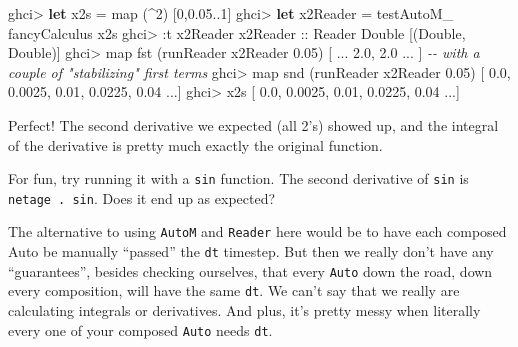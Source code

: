 \documentclass[]{article}
\newenvironment{Shaded}{}{}
\newcommand{\CommentTok}[1]{\textcolor[rgb]{0.38,0.63,0.69}{\textit{#1}}}
\newcommand{\DataTypeTok}[1]{\textcolor[rgb]{0.56,0.13,0.00}{#1}}
\newcommand{\DecValTok}[1]{\textcolor[rgb]{0.25,0.63,0.44}{#1}}
\newcommand{\FloatTok}[1]{\textcolor[rgb]{0.25,0.63,0.44}{#1}}
\newcommand{\FunctionTok}[1]{\textcolor[rgb]{0.02,0.16,0.49}{#1}}
\newcommand{\KeywordTok}[1]{\textcolor[rgb]{0.00,0.44,0.13}{\textbf{#1}}}
\newcommand{\NormalTok}[1]{#1}
\newcommand{\OperatorTok}[1]{\textcolor[rgb]{0.40,0.40,0.40}{#1}}
\newcommand{\OtherTok}[1]{\textcolor[rgb]{0.00,0.44,0.13}{#1}}
\begin{document}
\begin{Shaded}
\begin{Highlighting}[]
\NormalTok{ghci}\OperatorTok{>} \KeywordTok{let}\NormalTok{ x2s }\OtherTok{=} \FunctionTok{map}\NormalTok{ (}\OperatorTok{\^{}}\DecValTok{2}\NormalTok{) [}\DecValTok{0}\NormalTok{,}\FloatTok{0.05}\OperatorTok{..}\DecValTok{1}\NormalTok{]}
\NormalTok{ghci}\OperatorTok{>} \KeywordTok{let}\NormalTok{ x2Reader }\OtherTok{=}\NormalTok{ testAutoM\_ fancyCalculus x2s}
\NormalTok{ghci}\OperatorTok{>} \OperatorTok{:}\NormalTok{t x2Reader}
\OtherTok{x2Reader ::} \DataTypeTok{Reader} \DataTypeTok{Double}\NormalTok{ [(}\DataTypeTok{Double}\NormalTok{, }\DataTypeTok{Double}\NormalTok{)]}
\NormalTok{ghci}\OperatorTok{>} \FunctionTok{map} \FunctionTok{fst}\NormalTok{ (runReader x2Reader }\FloatTok{0.05}\NormalTok{)}
\NormalTok{[ }\OperatorTok{...} \FloatTok{2.0}\NormalTok{, }\FloatTok{2.0} \OperatorTok{...}\NormalTok{ ]    }\CommentTok{{-}{-} with a couple of "stabilizing" first terms}
\NormalTok{ghci}\OperatorTok{>} \FunctionTok{map} \FunctionTok{snd}\NormalTok{ (runReader x2Reader }\FloatTok{0.05}\NormalTok{)}
\NormalTok{[ }\FloatTok{0.0}\NormalTok{, }\FloatTok{0.0025}\NormalTok{, }\FloatTok{0.01}\NormalTok{, }\FloatTok{0.0225}\NormalTok{, }\FloatTok{0.04} \OperatorTok{...}\NormalTok{]}
\NormalTok{ghci}\OperatorTok{>}\NormalTok{ x2s}
\NormalTok{[ }\FloatTok{0.0}\NormalTok{, }\FloatTok{0.0025}\NormalTok{, }\FloatTok{0.01}\NormalTok{, }\FloatTok{0.0225}\NormalTok{, }\FloatTok{0.04} \OperatorTok{...}\NormalTok{]}
\end{Highlighting}
\end{Shaded}

Perfect! The second derivative we expected (all 2's) showed up, and the integral
of the derivative is pretty much exactly the original function.

For fun, try running it with a \texttt{sin} function. The second derivative of
\texttt{sin} is \texttt{netage\ .\ sin}. Does it end up as expected?

The alternative to using \texttt{AutoM} and \texttt{Reader} here would be to
have each composed Auto be manually ``passed'' the \texttt{dt} timestep. But
then we really don't have any ``guarantees'', besides checking ourselves, that
every \texttt{Auto} down the road, down every composition, will have the same
\texttt{dt}. We can't say that we really are calculating integrals or
derivatives. And plus, it's pretty messy when literally every one of your
composed \texttt{Auto} needs \texttt{dt}.
\end{document}
